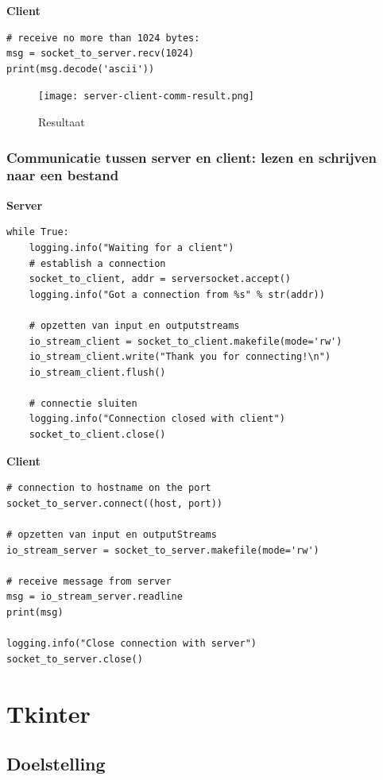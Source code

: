 \documentclass{article}
\begin{document}
\textbf{Client}

\begin{verbatim}
# receive no more than 1024 bytes:
msg = socket_to_server.recv(1024)
print(msg.decode('ascii'))
\end{verbatim}

\begin{figure}[H]
    \centering
    \texttt{[image: server-client-comm-result.png]}
    \caption{Resultaat}
\end{figure}

\subsubsection{Communicatie tussen server en client: lezen en schrijven naar een bestand}

\textbf{Server}

\begin{verbatim}
while True:
    logging.info("Waiting for a client")
    # establish a connection 
    socket_to_client, addr = serversocket.accept()
    logging.info("Got a connection from %s" % str(addr))
    
    # opzetten van input en outputstreams
    io_stream_client = socket_to_client.makefile(mode='rw')
    io_stream_client.write("Thank you for connecting!\n")
    io_stream_client.flush()

    # connectie sluiten
    logging.info("Connection closed with client")
    socket_to_client.close()
\end{verbatim}

\textbf{Client}

\begin{verbatim}
# connection to hostname on the port
socket_to_server.connect((host, port))

# opzetten van input en outputStreams
io_stream_server = socket_to_server.makefile(mode='rw')

# receive message from server
msg = io_stream_server.readline
print(msg)

logging.info("Close connection with server")
socket_to_server.close()
\end{verbatim}


\section{Tkinter}

\subsection{Doelstelling}
\end{document}
